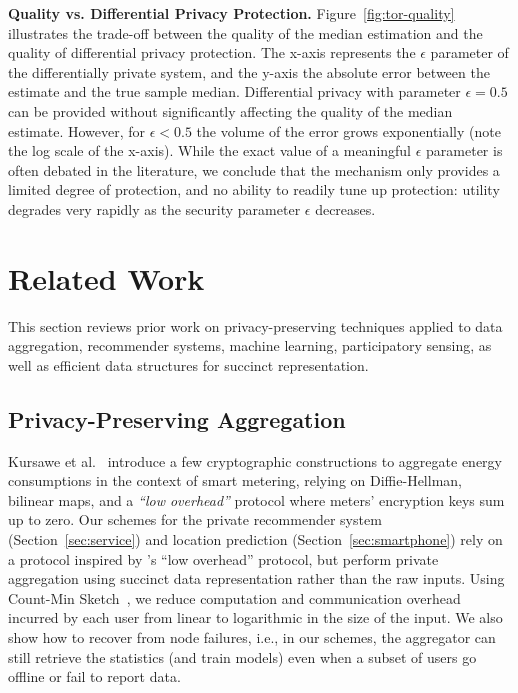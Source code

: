 \documentclass[conference]{IEEEtran}
\newcommand{\descr}[1]{\medskip \noindent \textbf{#1}}
\begin{document}
\descr{Quality vs. Differential Privacy Protection.} Figure~\ref{fig:tor-quality} illustrates the trade-off between the quality of the median estimation and the quality of differential privacy protection. The x-axis represents the $\epsilon$ parameter of the differentially private system, and the y-axis the absolute error between the estimate and the true sample median. Differential privacy with parameter $\epsilon = 0.5$ can be provided without significantly affecting the quality of the median estimate. However, for $\epsilon < 0.5$ the volume of the error grows exponentially (note the log scale of the x-axis). While the exact value of a 
meaningful $\epsilon$ parameter is often debated in the literature, we conclude that the mechanism only provides a limited degree of protection, and no ability to readily tune up protection: utility degrades very rapidly as the security parameter $\epsilon$ decreases.

\section{Related Work}
\label{sec:work}
This section reviews prior work on privacy-preserving techniques applied to data aggregation, recommender systems,  machine learning, participatory sensing, as well as efficient data structures for succinct representation. 



\subsection{Privacy-Preserving Aggregation}
\label{sec: data-aggr} 
Kursawe et al.~\cite{Kursawe:2011} introduce a few cryptographic constructions to aggregate energy consumptions in the context of smart metering, relying on Diffie-Hellman, bilinear maps, and a {\em ``low overhead''} protocol where meters' encryption keys sum up to zero. 
Our schemes for the private recommender system (Section~\ref{sec:service}) 
and location prediction (Section~\ref{sec:smartphone}) rely on 
a protocol inspired by \cite{Kursawe:2011}'s ``low overhead'' protocol, but perform private aggregation using succinct data representation rather than the raw inputs. Using Count-Min Sketch~\cite{cormode2005improved}, we reduce computation and communication overhead incurred by each user from linear to logarithmic in the size of the input. We also show how to recover from node failures, i.e., in our schemes, the aggregator can still retrieve the statistics (and train models) even when a subset of users go offline or fail to report data.
\end{document}
